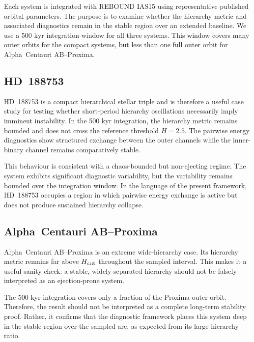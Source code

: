 \documentclass[12pt,a4paper]{article}
\newcommand{\Hcrit}{H_{\rm crit}}
\begin{document}
Each system is integrated with REBOUND IAS15 using representative published orbital parameters. The purpose is to examine whether the hierarchy metric and associated diagnostics remain in the stable region over an extended baseline. We use a 500 kyr integration window for all three systems. This window covers many outer orbits for the compact systems, but less than one full outer orbit for Alpha~Centauri AB--Proxima.

\subsection{HD~188753}
\label{sec:hd188753}

HD~188753 is a compact hierarchical stellar triple and is therefore a useful case study for testing whether short-period hierarchy oscillations necessarily imply imminent instability. In the 500 kyr integration, the hierarchy metric remains bounded and does not cross the reference threshold \(H=2.5\). The pairwise energy diagnostics show structured exchange between the outer channels while the inner-binary channel remains comparatively stable.

This behaviour is consistent with a chaos-bounded but non-ejecting regime. The system exhibits significant diagnostic variability, but the variability remains bounded over the integration window. In the language of the present framework, HD~188753 occupies a region in which pairwise energy exchange is active but does not produce sustained hierarchy collapse.

\subsection{Alpha~Centauri AB--Proxima}
\label{sec:alpha_cen}

Alpha~Centauri AB--Proxima is an extreme wide-hierarchy case. Its hierarchy metric remains far above \(\Hcrit\) throughout the sampled interval. This makes it a useful sanity check: a stable, widely separated hierarchy should not be falsely interpreted as an ejection-prone system.

The 500 kyr integration covers only a fraction of the Proxima outer orbit. Therefore, the result should not be interpreted as a complete long-term stability proof. Rather, it confirms that the diagnostic framework places this system deep in the stable region over the sampled arc, as expected from its large hierarchy ratio.
\end{document}
